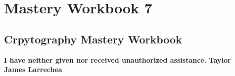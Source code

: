 \clearpage
\chapter{Mastery Workbook 7}

\section{Crpytography Mastery Workbook}


\begin{center}
    \Large{\textbf{I have neither given nor received unauthorized assistance.}}
    \large{\textbf{Taylor James Larrechea}}
\end{center}

